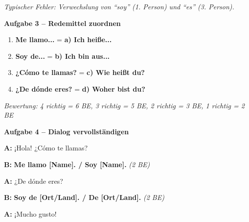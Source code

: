 \documentclass[11pt, a4paper]{article}
\newcommand{\punktebox}[1]{\hfill\fbox{\small \_\_\_/#1}}
\newcommand{\es}[1]{\textcolor{spanisch}{\textbf{#1}}}
\newcommand{\lsg}[1]{\textcolor{loesung}{\textbf{#1}}}
\begin{document}
\vspace{5pt}
\textit{Typischer Fehler: Verwechslung von ``soy'' (1. Person) und ``es'' (3. Person).}

\vspace{15pt}


\noindent\textbf{\textcolor{spanisch}{Aufgabe 3 -- Redemittel zuordnen}} \punktebox{6}

\vspace{10pt}

\begin{enumerate}[label=\arabic*.]
    \item \es{Me llamo...} = \lsg{a) Ich heiße...}
    \item \es{Soy de...} = \lsg{b) Ich bin aus...}
    \item \es{¿Cómo te llamas?} = \lsg{c) Wie heißt du?}
    \item \es{¿De dónde eres?} = \lsg{d) Woher bist du?}
\end{enumerate}

\vspace{5pt}
\textit{Bewertung: 4 richtig = 6 BE, 3 richtig = 5 BE, 2 richtig = 3 BE, 1 richtig = 2 BE}

\vspace{15pt}


\noindent\textbf{\textcolor{spanisch}{Aufgabe 4 -- Dialog vervollständigen}} \punktebox{6}

\vspace{10pt}

\noindent
\textbf{A:} ¡Hola! ¿Cómo te llamas?

\vspace{0.4em}
\noindent
\textbf{B:} \lsg{Me llamo [Name]. / Soy [Name].} \hfill \textit{(2 BE)}

\vspace{0.6em}
\noindent
\textbf{A:} ¿De dónde eres?

\vspace{0.4em}
\noindent
\textbf{B:} \lsg{Soy de [Ort/Land]. / De [Ort/Land].} \hfill \textit{(2 BE)}

\vspace{0.6em}
\noindent
\textbf{A:} ¡Mucho gusto!
\end{document}
